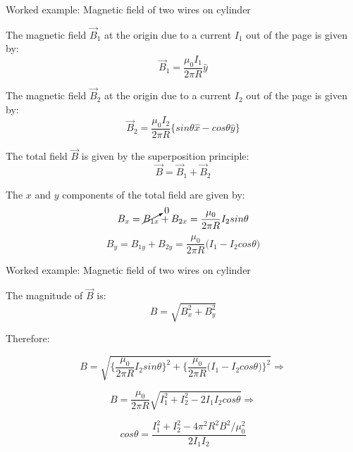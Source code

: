 {%
%
%

\begin{frame}{Worked example: Magnetic field of two wires on cylinder}

  The magnetic field $\vec{B}_{1}$ at the origin due
  to a current $I_1$ out of the page is given by:
  \begin{equation*}
    \vec{B}_{1} = \frac{\mu_0 I_1}{2\pi R} \hat{y}
  \end{equation*}

  The magnetic field $\vec{B}_{2}$ at the origin due
  to a current $I_2$ out of the page is given by:
  \begin{equation*}
    \vec{B}_{2} = \frac{\mu_0 I_2}{2\pi R} \Big\{ sin\theta \hat{x} - cos\theta \hat{y} \Big\}
  \end{equation*}

  The total field $\vec{B}$ is given by the superposition principle:
  \begin{equation*}
    \vec{B} = \vec{B}_{1} + \vec{B}_{2}
  \end{equation*}

  The $x$ and $y$ components of the total field are given by:
  \begin{equation*}
    B_{x} = \cancelto{0}{B_{1x}} + B_{2x} =  \frac{\mu_0}{2\pi R} I_2 sin\theta
  \end{equation*}
  \begin{equation*}
    B_{y} = B_{1y} + B_{2y} =  \frac{\mu_0}{2\pi R} \Big( I_1 - I_2 cos\theta \Big)
  \end{equation*}
\end{frame}

%
%
%

\begin{frame}{Worked example: Magnetic field of two wires on cylinder}

  The magnitude of $\vec{B}$ is:
  \begin{equation*}
    B = \sqrt{B_{x}^2 + B_{y}^2}
  \end{equation*}

  Therefore:

  \begin{equation*}
    B = \sqrt{
      \Big\{ \frac{\mu_0}{2\pi R} I_2 sin\theta \Big\}^2 +
      \Big\{ \frac{\mu_0}{2\pi R} \Big( I_1 - I_2 cos\theta \Big) \Big\}^2 } \Rightarrow
  \end{equation*}

  \begin{equation*}
    B = \frac{\mu_0}{2\pi R} \sqrt{I_1^2 + I_2^2 - 2 I_1 I_2 cos\theta} \Rightarrow
  \end{equation*}

  \begin{equation*}
    cos\theta = \frac{I_1^2 + I_2^2 - 4\pi^2 R^2 B^2/\mu_0^2}{2 I_1 I_2}
  \end{equation*}

\end{frame}

} %


